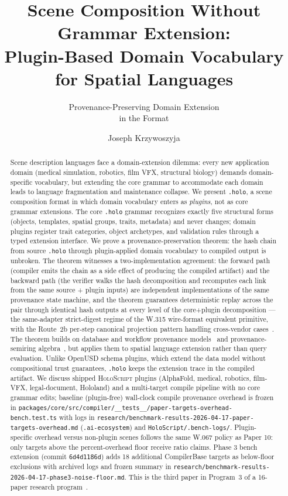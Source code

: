 \documentclass[sigconf,nonacm]{acmart}
\title{Scene Composition Without Grammar Extension:\\
Plugin-Based Domain Vocabulary for Spatial Languages}
\subtitle{Provenance-Preserving Domain Extension\\
in the \holoscript{} \holo{} Format}
\author{Joseph Krzywoszyja}
\affiliation{%
  \institution{Infinitus Systems}
  \country{USA}
}
\newcommand{\holoscript}{\textsc{HoloScript}}
\newcommand{\holo}{\texttt{.holo}}
\begin{document}
\begin{abstract}
Scene description languages face a domain-extension dilemma: every
new application domain (medical simulation, robotics, film VFX,
structural biology) demands domain-specific vocabulary, but
extending the core grammar to accommodate each domain leads to
language fragmentation and maintenance collapse. We present
\holo{}, a scene composition format in which domain vocabulary
enters as \emph{plugins}, not as core grammar extensions. The core
\holo{} grammar recognizes exactly five structural forms (objects,
templates, spatial groups, traits, metadata) and never changes; domain
plugins register trait categories, object archetypes, and validation
rules through a typed extension interface. We prove a
provenance-preservation theorem: the hash chain from source \holo{}
through plugin-applied domain vocabulary to compiled output is
unbroken. The theorem witnesses a two-implementation agreement: the
forward path (compiler emits the chain as a side effect of producing
the compiled artifact) and the backward path (the verifier walks the
hash decomposition and recomputes each link from the same source +
plugin inputs) are independent implementations of the same provenance
state machine, and the theorem guarantees deterministic replay across
the pair through identical hash outputs at every level of the
core+plugin decomposition --- the same-adapter strict-digest regime
of the W.315 wire-format equivalent primitive, with the Route~2b
per-step canonical projection pattern handling cross-vendor
cases~\cite{paper-0c-twin-test-2026-05-11}. The theorem builds on
database and workflow provenance
models~\cite{buneman2001provenance,prov-dm-w3c}
and provenance-semiring algebra~\cite{green2007provenance}, but
applies them to spatial language extension rather than query
evaluation. Unlike OpenUSD schema plugins, which extend the data
model without compositional trust guarantees, \holo{} keeps the
extension trace in the compiled artifact. We discuss shipped
\holoscript{} plugins (AlphaFold, medical, robotics, film-VFX,
legal-document, Hololand) and a multi-target compile pipeline with
no core grammar edits; baseline (plugin-free) wall-clock compile provenance
overhead is frozen in
\texttt{packages/core/src/compiler/\_\_tests\_\_/paper-targets-overhead-bench.test.ts}
with logs in \texttt{research/benchmark-results-2026-04-17-paper-targets-overhead.md}
(\texttt{.ai-ecosystem}) and \texttt{HoloScript/.bench-logs/}. Plugin-specific
overhead versus non-plugin scenes follows the same W.067 policy as Paper 10:
only targets above the percent-overhead floor receive ratio claims. Phase 3
bench extension (commit \texttt{6d4d1186d}) adds 18 additional CompilerBase
targets as below-floor exclusions with archived logs and frozen summary in
\texttt{research/benchmark-results-2026-04-17-phase3-noise-floor.md}.
This is the third
paper in Program~3 of a 16-paper research
program~\cite{trustbyconstruction2026,capstone-uist2027}.
\end{abstract}
\end{document}
